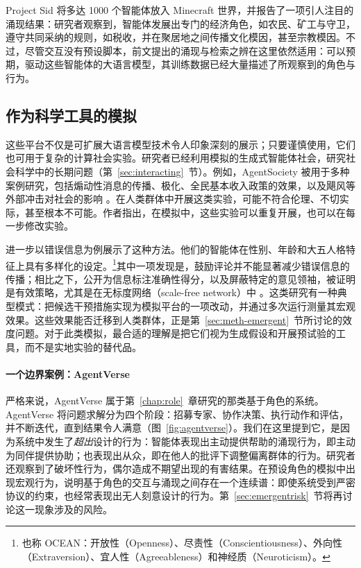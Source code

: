 Project Sid \citep{al2024projectsid} 将多达 1000 个智能体放入 Minecraft 世界，并报告了一项引人注目的涌现结果：研究者观察到，智能体发展出专门的经济角色，如农民、矿工与守卫，遵守共同采纳的规则，如税收，并在聚居地之间传播文化模因，甚至宗教模因。不过，尽管交互没有预设脚本，前文提出的涌现与检索之辨在这里依然适用：可以预期，驱动这些智能体的大语言模型，其训练数据已经大量描述了所观察到的角色与行为。

\subsection{作为科学工具的模拟}
这些平台不仅是可扩展大语言模型技术令人印象深刻的展示；只要谨慎使用，它们也可用于复杂的计算社会实验。研究者已经利用模拟的生成式智能体社会，研究社会科学中的长期问题（第~\ref{sec:interacting}~节）。例如，AgentSociety 被用于多种案例研究，包括煽动性消息的传播、极化、全民基本收入政策的效果，以及飓风等外部冲击对社会的影响 \citep{piao2025agentsociety, piao2025polarization}。在人类群体中开展这类实验，可能不符合伦理、不切实际，甚至根本不可能。作者指出，在模拟中，这些实验可以重复开展，也可以在每一步修改实验。

\citet{li2024large} 进一步以错误信息为例展示了这种方法。他们的智能体在性别、年龄和大五人格特征上具有多样化的设定。\footnote{也称 OCEAN：开放性（Openness）、尽责性（Conscientiousness）、外向性（Extraversion）、宜人性（Agreeableness）和神经质（Neuroticism）。}其中一项发现是，鼓励评论并不能显著减少错误信息的传播；相比之下，公开为信息标注准确性得分，以及屏蔽特定的意见领袖，被证明是有效策略，尤其是在无标度网络（scale-free network）中 \citep{barabasi2009scale}。这类研究有一种典型模式：把候选干预措施实现为模拟平台的一项改动，并通过多次运行测量其宏观效果。这些效果能否迁移到人类群体，正是第~\ref{sec:meth-emergent}~节所讨论的效度问题。对于此类模拟，最合适的理解是把它们视为生成假设和开展预试验的工具，而不是实地实验的替代品。

\paragraph{一个边界案例：AgentVerse}
严格来说，AgentVerse \citep{chen2023agentverse} 属于第~\ref{chap:role}~章研究的那类基于角色的系统。AgentVerse 将问题求解分为四个阶段：招募专家、协作决策、执行动作和评估，并不断迭代，直到结果令人满意（图~\ref{fig:agentverse}）。我们在这里提到它，是因为系统中发生了\emph{超出}设计的行为：智能体表现出主动提供帮助的涌现行为，即主动为同伴提供协助；也表现出从众，即在他人的批评下调整偏离群体的行为。研究者还观察到了破坏性行为，偶尔造成不期望出现的有害结果。在预设角色的模拟中出现宏观行为，说明基于角色的交互与涌现之间存在一个连续谱：即使系统受到严密协议的约束，也经常表现出无人刻意设计的行为。第~\ref{sec:emergentrisk}~节将再讨论这一现象涉及的风险。

